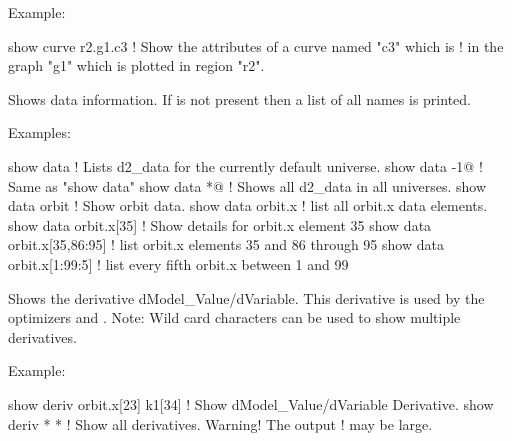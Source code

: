 {{{\begin{description}
Example:
\begin{example}
  show curve r2.g1.c3     ! Show the attributes of a curve named "c3" which is 
                          !   in the graph "g1" which is plotted in region "r2".
\end{example}


\item[show data \{<data\_name>\}] \Newline

\vskip -0.2in

Shows data information. If  is not
present then a list of all  names is printed.

Examples:
\begin{example}
  show data                   ! Lists d2_data for the currently default universe.
  show data -1@               ! Same as "show data"
  show data *@                ! Shows all d2_data in all universes.
  show data orbit             ! Show orbit data.
  show data orbit.x           ! list all orbit.x data elements.
  show data orbit.x[35]       ! Show details for orbit.x element 35
  show data orbit.x[35,86:95] ! list orbit.x elements 35 and 86 through 95
  show data orbit.x[1:99:5]   ! list every fifth orbit.x between 1 and 99  
\end{example}


\item[show derivative <data\_name(s)> <var\_name(s)>] \Newline

\vskip -0.2in

Shows the derivative dModel\_Value/dVariable. This derivative is used
by the optimizers  and . Note: Wild card characters can
be used to show multiple derivatives.

Example:
\begin{example}
  show deriv orbit.x[23] k1[34] ! Show dModel_Value/dVariable Derivative.
  show deriv * *                ! Show all derivatives. Warning! The output 
                                ! may be large.
\end{example}


\item[show dynamic_aperture] \Newline


\end{description}}}}
